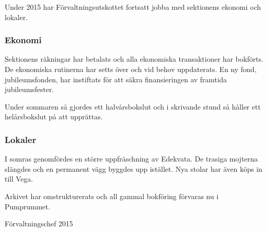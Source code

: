 \documentclass[../_main/handlingar.tex]{subfiles}
\begin{document}

Under 2015 har Förvaltningsutskottet fortsatt jobba med sektionens ekonomi och lokaler.

\subsubsection*{Ekonomi}
Sektionens räkningar har betalats och alla ekonomiska transaktioner har bokförts. De ekonomiska rutinerna har setts över och vid behov uppdaterats. En ny fond, jubileumsfonden, har instiftats för att säkra finansieringen av framtida jubileumsfester.

Under sommaren så gjordes ett halvårsbokslut och i skrivande stund så håller ett helårsbokslut på att upprättas.

\subsubsection*{Lokaler}
I somras genomfördes en större uppfräschning av Edekvata. De trasiga mojterna slängdes och en permanent vägg byggdes upp istället. Nya stolar har även köps in till Vega.

Arkivet har omstrukturerats och all gammal bokföring förvaras nu i Pumprummet.

\begin{signatures}{1}
    \mvh
    \signature{Henrik Felding}{Förvaltningschef 2015}
\end{signatures}
\end{document}
